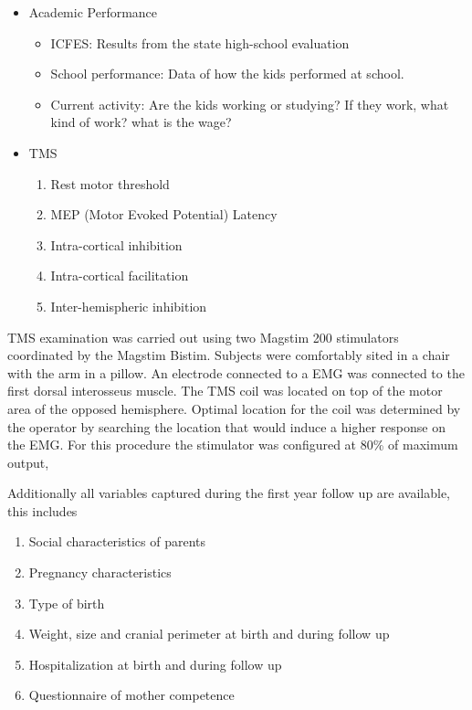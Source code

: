 \begin{itemize}
\begin{itemize}
	\end{itemize}
	\item Academic Performance
	\begin{itemize}
		\item ICFES: Results from the state high-school evaluation
		\item School performance: Data of how the kids performed at school.
		\item Current activity: Are the kids working or studying? If they work, what kind of work? what is the wage?
	\end{itemize}
	\item TMS %
	\begin{enumerate}
		\item Rest motor threshold
		\item MEP (Motor Evoked Potential) Latency
		\item Intra-cortical inhibition
		\item Intra-cortical facilitation
		\item Inter-hemispheric inhibition
	\end{enumerate}
\end{itemize}


TMS examination was carried out using two Magstim 200 stimulators coordinated by the Magstim Bistim. Subjects were comfortably sited in a chair with the arm in a pillow. An electrode connected to a EMG was connected to the first dorsal interosseus muscle. The TMS coil was located on top of the motor area of the opposed hemisphere. Optimal location for the coil was determined by the operator by searching the location that would induce a higher response on the EMG. For this procedure the stimulator was configured at 80\% of maximum output, 

Additionally all variables captured during the first year follow up are available, this includes

\begin{enumerate}
\item Social characteristics of parents
\item Pregnancy characteristics 
\item Type of birth
\item Weight, size and cranial perimeter at birth and during follow up
\item Hospitalization at birth and during follow up
\item Questionnaire of mother competence
\end{enumerate}

